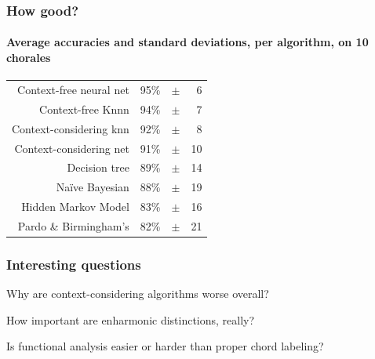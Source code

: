 \documentclass{beamer}
\begin{document}
\begin{frame}
  \frametitle{How good?}
  \framesubtitle{Average accuracies and standard deviations, per
    algorithm, on 10 chorales}
  
  \begin{center}
    \begin{tabular}{rrrr}
      Context-free neural net & 95\% &$\pm$  &  6 \\
      Context-free Knnn       & 94\% &$\pm$  &  7 \\
      Context-considering knn & 92\% &$\pm$  &  8 \\ 
      Context-considering net & 91\% &$\pm$  & 10 \\ 
      Decision tree           & 89\% &$\pm$  & 14 \\ 
      Naïve Bayesian          & 88\% &$\pm$  & 19 \\ 
      Hidden Markov Model     & 83\% &$\pm$  & 16 \\ 
      Pardo \& Birmingham's   & 82\% &$\pm$  & 21 \\ 
    \end{tabular}
  \end{center}
\end{frame}

\begin{frame}
  \frametitle{Interesting questions}
  Why are context-considering algorithms worse overall?
  
  \addvspace{2em}

  How important are enharmonic distinctions, really?

  \addvspace{2em}
  
  Is functional analysis easier or harder than proper chord labeling?
\end{frame}
\end{document}
